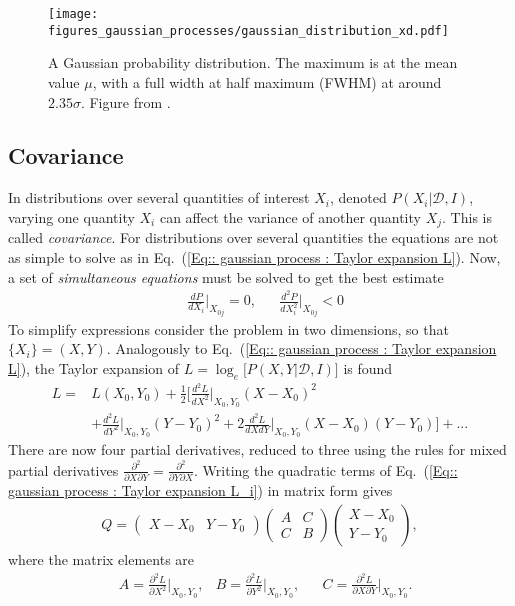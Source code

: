 \documentclass[twoside,english]{uiofysmaster}
\begin{document}
{\begin{figure}
\centering
\texttt{[image: figures\_gaussian\_processes/gaussian\_distribution\_xd.pdf]}
\caption{A Gaussian probability distribution. The maximum is at the mean value $\mu$, with a full width at half maximum (FWHM) at around $2.35 \sigma$. Figure from \cite{sivia2006data}.}
\label{Fig:: gaussian process : Gaussian distribution}
\end{figure}

\subsection{Covariance}\label{Sec:: gaussian process : Covariance}

In distributions over several quantities of interest $X_i$, denoted $P(X_i| \mathcal{D}, I)$, varying one quantity $X_i$ can affect the variance of another quantity $X_j$. This is called \textit{covariance}. For distributions over several quantities the equations are not as simple to solve as in Eq.\ (\ref{Eq:: gaussian process : Taylor expansion L}). Now, a set of \textit{simultaneous equations} must be solved to get the best estimate
\begin{align}\label{Eq:: gaussian process : Best estimate X_i}
&\frac{dP}{dX_i} \Big|_{X_{0j}} =0, &&\frac{d^2P}{dX_i^2} \Big|_{X_{0j}} < 0
\end{align}
To simplify expressions consider the problem in two dimensions, so that $\{ X_i \} = (X, Y)$. Analogously to Eq.~(\ref{Eq:: gaussian process : Taylor expansion L}), the Taylor expansion of $L = \log_e \Big[ P(X, Y |\mathcal{D}, I) \Big]$ is found
\begin{align}\label{Eq:: gaussian process : Taylor expansion L_i}
L =& L(X_0, Y_0) + \frac{1}{2} \Big[ \frac{d^2L}{dX^2}  \Big|_{X_0, Y_0}(X-X_0)^2 \nonumber \\
& + \frac{d^2L}{dY^2}  \Big|_{X_0, Y_0}(Y-Y_0)^2 + 2 \frac{d^2L}{dXdY}  \Big|_{X_0, Y_0}(X-X_0)(Y-Y_0) \Big] +...
\end{align}
There are now four partial derivatives, reduced to three using the rules for mixed partial derivatives $\frac{\partial^2}{\partial X \partial Y} = \frac{\partial^2}{\partial Y \partial X}$. Writing the quadratic terms of Eq.~(\ref{Eq:: gaussian process : Taylor expansion L_i}) in matrix form gives
\begin{align}
Q = 
\begin{pmatrix}
X-X_0 & Y -Y_0
\end{pmatrix}
\begin{pmatrix}
A & C\\
C & B
\end{pmatrix}
\begin{pmatrix}
X -X_0\\
Y-Y_0
\end{pmatrix},
\end{align}
where the matrix elements are
\begin{align}\label{Eq:: gaussian process : covariance matrix ABC}
&A = \frac{\partial^2 L}{\partial X^2} \Big|_{X_0, Y_0}, &B = \frac{\partial^2 L}{\partial Y^2} \Big|_{X_0, Y_0}, &&C = \frac{\partial^2 L}{\partial X \partial Y} \Big|_{X_0, Y_0}.
\end{align}

}
\end{document}
